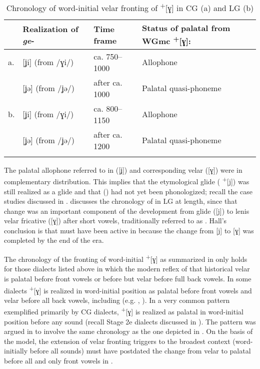 \begin{table}
\caption{Chronology of word-initial velar fronting of  \textsuperscript{+}[ɣ] in CG (a) and LG (b)\label{tab:16:1}}
\begin{tabular}{llll}
\lsptoprule
   & Realization of \textit{ge}- & Time frame &   Status of palatal from WGmc \textsuperscript{+}[ɣ]:\\\midrule
a. & [ʝi] (from /ɣi/) & ca. 750--1000  & Allophone \\
   & [ʝə] (from /ʝə/) & after ca. 1000 & Palatal quasi-phoneme \\\tablevspace
b. & [ʝi] (from /ɣi/) & ca. 800--1150  & Allophone \\
   & [ʝə] (from /ʝə/) & after ca. 1200 & Palatal quasi-phoneme\\
\lspbottomrule
\end{tabular}
\end{table}

The palatal allophone referred to in  ([ʝ]) and corresponding velar ([ɣ]) were in complementary distribution. This implies that the etymological glide ( \textsuperscript{+}[j]) was still realized as a glide and that  () had not yet been phonologized; recall the case studies discussed in . \citet{Hall2014a} discusses the chronology of  in LG at length, since that change was an important component of the development from glide ([j]) to lenis velar fricative ([ɣ]) after short vowels, traditionally referred to as . Hall’s conclusion is that  must have been active in  because the change from [j] to [ɣ] was completed by the end of the  era.

The chronology of the fronting of word-initial  \textsuperscript{+}[ɣ] as summarized in   only holds for those dialects listed above in which the modern reflex of that historical velar is palatal before front vowels or before  but velar before full back vowels. In some dialects  \textsuperscript{+}[ɣ] is realized in word-initial position as palatal before front vowels and velar before all back vowels, including  (e.g. , ). In a very common pattern exemplified primarily by CG dialects,  \textsuperscript{+}[ɣ] is realized as palatal in word-initial position before any sound (recall Stage 2e dialects discussed in ). The  pattern was argued in  to involve the same chronology as the one depicted in . On the basis of the  model, the extension of velar fronting triggers to the broadest context (word-initially before all sounds) must have postdated the change from velar to palatal before all and only front vowels in .

